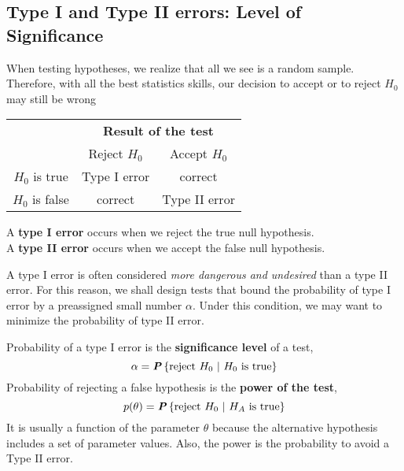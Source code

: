 \subsection{Type I and Type II errors: Level of Significance}
\label{subsec:type-1-2-errors}

When testing hypotheses, we realize that all we see is a random sample. Therefore, with all the best statistics skills, our decision to accept or to reject $H_0$ may still be wrong
\begin{table}[H]
  \centering
  \renewcommand{\arraystretch}{2}
  \begin{tabular}{|c|c|c|} 
  \cline{2-3}
  \multicolumn{1}{c|}{} & \multicolumn{2}{c|}{\textbf{Result of the test}}  \\ 
  \cline{2-3}
  \multicolumn{1}{c|}{} & Reject $H_0$  & Accept $H_0$               \\ 
  \hline
  $H_0$ is true          & Type I error & correct                   \\ 
  \hline
  $H_0$ is false         & correct      & Type II error             \\
  \hline
  \end{tabular}
\end{table}
\begin{definition}{}
  A \textbf{type I error} occurs when we reject the true null hypothesis.\\

  A \textbf{type II error} occurs when we accept the false null hypothesis.
\end{definition}

A type I error is often considered \textit{more dangerous and undesired} than a type II error. For this reason,  we shall design tests that bound the probability of type I error by a preassigned small number $\alpha$. Under this condition, we may want to minimize the probability of type II error.

\begin{definition}{}
  Probability of a type I error is the \textbf{significance level} of a test,
  \begin{equation*}
    \alpha = \textbf{\textit{P}}\left\{\textnormal{reject } H_0\ |\ H_0 \textnormal{ is true}\right\}
  \end{equation*}
  Probability of rejecting a false hypothesis is the \textbf{power of the test},
  \begin{equation*}
    p(\theta) = \textbf{\textit{P}}\left\{\textnormal{reject } H_0\ |\ H_A \textnormal{ is true}\right\}
  \end{equation*}
  It is usually a function of the parameter $\theta$ because the alternative hypothesis includes a set of parameter values. Also, the power is the probability to avoid a Type II error.
\end{definition}
